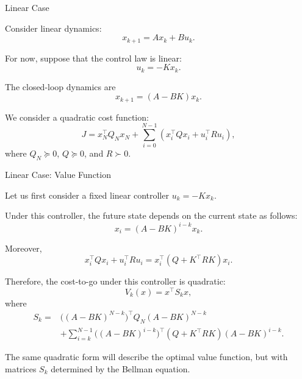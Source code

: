 \documentclass{beamer}
\begin{document}
\begin{frame}{Linear Case}
	\begin{flushleft}
		
		Consider linear dynamics:
		\[
		x_{k+1}=Ax_k+Bu_k.
		\]
		
		For now, suppose that the control law is linear:
		\[
		u_k=-Kx_k.
		\]
		
		The closed-loop dynamics are
		\[
		x_{k+1}=(A-BK)x_k.
		\]
		
		\medskip
		
		We consider a quadratic cost function:
		\[
		J=x_N^\top Q_Nx_N+
		\sum_{i=0}^{N-1}
		\left(x_i^\top Qx_i+u_i^\top Ru_i\right),
		\]
		where $Q_N\succeq0$, $Q\succeq0$, and $R\succ0$.
		
	\end{flushleft}
\end{frame}

\begin{frame}{Linear Case: Value Function}
	\begin{flushleft}
		{\small
		Let us first consider a fixed linear controller
		$u_k=-Kx_k$.
		
		Under this controller, the future state depends on the
		current state as follows:
		\[
		x_i=(A-BK)^{i-k}x_k.
		\]
		
		Moreover,
		\[
		x_i^\top Qx_i+u_i^\top Ru_i
		=x_i^\top(Q+K^\top RK)x_i.
		\]
		
		\medskip
		
		Therefore, the cost-to-go under this controller is
		quadratic:
		\[
		V_k(x)=x^\top S_kx,
		\]
		where
		\[
		\begin{aligned}
			S_k={}&
			\bigl((A-BK)^{N-k}\bigr)^\top
			Q_N(A-BK)^{N-k}\\
			&+\sum_{i=k}^{N-1}
			\bigl((A-BK)^{i-k}\bigr)^\top
			(Q+K^\top RK)
			(A-BK)^{i-k}.
		\end{aligned}
		\]
		
		\medskip
		
		The same quadratic form will describe the optimal
		value function, but with matrices $S_k$ determined
		by the Bellman equation.}
		
	\end{flushleft}
\end{frame}
\end{document}
